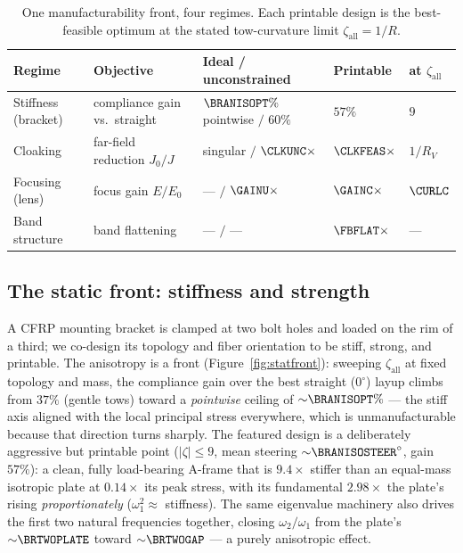 \documentclass[preprint,11pt]{elsarticle}
\newcommand{\zall}{\zeta_{\mathrm{all}}}
\theoremstyle{plain}\newtheorem{proposition}{Proposition}
\theoremstyle{remark}\newtheorem{remark}{Remark}
\begin{document}
\begin{table}[htbp]
\centering\small
\caption{One manufacturability front, four regimes. Each printable design is the
best-feasible optimum at the stated tow-curvature limit $\zall=1/R$.}
\label{tab:front}
\begin{tabular}{@{}lllll@{}}
\toprule
Regime & Objective & Ideal / unconstrained & Printable & at $\zall$\\
\midrule
Stiffness (bracket) & compliance gain vs.\ straight
  & $\BRANISOPT\%$ pointwise $/$ $60\%$ & $57\%$ & $9$\\
Cloaking & far-field reduction $J_0/J$
  & singular $/$ $\CLKUNC\times$ & $\CLKFEAS\times$ & $1/R_V$\\
Focusing (lens) & focus gain $E/E_0$
  & --- $/$ $\GAINU\times$ & $\GAINC\times$ & $\CURLC$\\
Band structure & band flattening
  & --- $/$ --- & $\FBFLAT\times$ & ---\\
\bottomrule
\end{tabular}
\end{table}

\subsection{The static front: stiffness and strength}
\label{sec:stiff}
A CFRP mounting bracket is clamped at two bolt holes and loaded on the rim of a third; we
co-design its topology and fiber orientation to be stiff, strong, and printable. The
anisotropy is a front (Figure~\ref{fig:statfront}): sweeping $\zall$ at fixed topology and
mass, the compliance gain over the best straight ($0^\circ$) layup climbs from $37\%$
(gentle tows) toward a \emph{pointwise} ceiling of ${\sim}\BRANISOPT\%$ --- the stiff axis
aligned with the local principal stress everywhere, which is unmanufacturable because that
direction turns sharply. The featured design is a deliberately aggressive but printable
point ($|\zeta|\!\le\!9$, mean steering ${\sim}\BRANISOSTEER^\circ$, gain $57\%$): a clean,
fully load-bearing A-frame that is $9.4\times$ stiffer than an equal-mass isotropic plate
at $0.14\times$ its peak stress, with its fundamental $2.98\times$ the plate's rising
\emph{proportionately} ($\omega_1^2\!\approx\!$ stiffness). The same eigenvalue machinery
also drives the first two natural frequencies together, closing $\omega_2/\omega_1$ from
the plate's ${\sim}\BRTWOPLATE$ toward ${\sim}\BRTWOGAP$ --- a purely anisotropic effect.
\end{document}
